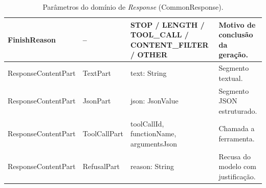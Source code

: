\begin{table}[H]
\begin{tabularx}{\textwidth}{|>{\raggedright\arraybackslash}p{3.4cm}|>{\raggedright\arraybackslash}p{2.2cm}|>{\raggedright\arraybackslash}p{3.8cm}|>{\raggedright\arraybackslash}X|}
        FinishReason & -- & STOP / LENGTH / \newline TOOL\_CALL / \newline CONTENT\_FILTER / \newline OTHER & Motivo de conclusão da geração. \\ \hline

        ResponseContentPart & TextPart & text: String & Segmento textual. \\ \hline
        ResponseContentPart & JsonPart & json: JsonValue & Segmento JSON estruturado. \\ \hline
        ResponseContentPart & ToolCallPart & toolCallId, \newline functionName, \newline argumentsJson & Chamada a ferramenta. \\ \hline
        ResponseContentPart & RefusalPart & reason: String & Recusa do modelo com justificação. \\ \hline

    \end{tabularx}
    \caption{Parâmetros do domínio de \textit{Response} (CommonResponse).}
    \label{tab:response-parametros}
\end{table}



